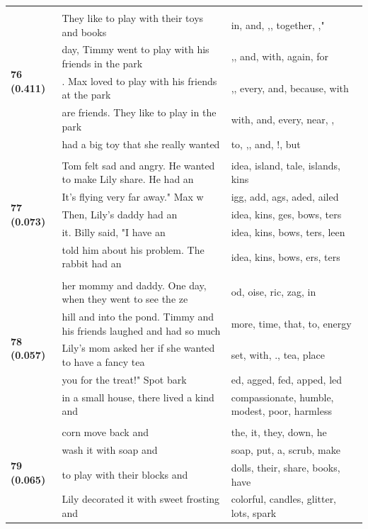 \documentclass{article}
\theoremstyle{plain}
\theoremstyle{definition}
\theoremstyle{remark}
\begin{document}
\begin{longtable}{|p{}|p{}|p{}|}
& & \\
\multirow{5}{*}{\textbf{76 (0.411)}} & They like to play with their toys and books & in,  and, ,,  together, ," \\
& day, Timmy went to play with his friends in the park & ,,  and,  with,  again,  for \\
& . Max loved to play with his friends at the park & ,,  every,  and,  because,  with \\
& are friends. They like to play in the park & with,  and,  every,  near, , \\
& had a big toy that she really wanted & to, ,,  and, !,  but \\
& & \\
\multirow{5}{*}{\textbf{77 (0.073)}} & Tom felt sad and angry. He wanted to make Lily share. He had an & idea,  island,  tale,  islands, kins \\
& It's flying very far away."  Max w & igg, add, ags, aded, ailed \\
& Then, Lily's daddy had an & idea, kins, ges, bows, ters \\
& it. Billy said, "I have an & idea, kins, bows, ters, leen \\
& told him about his problem.   The rabbit had an & idea, kins, bows, ers, ters \\
& & \\
\multirow{5}{*}{\textbf{78 (0.057)}} & her mommy and daddy. One day, when they went to see the ze & od, oise, ric, zag, in \\
& hill and into the pond. Timmy and his friends laughed and had so much & more,  time,  that,  to,  energy \\
& Lily's mom asked her if she wanted to have a fancy tea & set,  with, .,  tea,  place \\
& you for the treat!" Spot bark & ed, agged, fed, apped, led \\
& in a small house, there lived a kind and & compassionate,  humble,  modest,  poor,  harmless \\
& & \\
\multirow{5}{*}{\textbf{79 (0.065)}} & corn move back and & the,  it,  they,  down,  he \\
& wash it with soap and & soap,  put,  a,  scrub,  make \\
& to play with their blocks and & dolls,  their,  share,  books,  have \\
& Lily decorated it with sweet frosting and & colorful,  candles,  glitter,  lots,  spark \\

\end{longtable}
\end{document}
